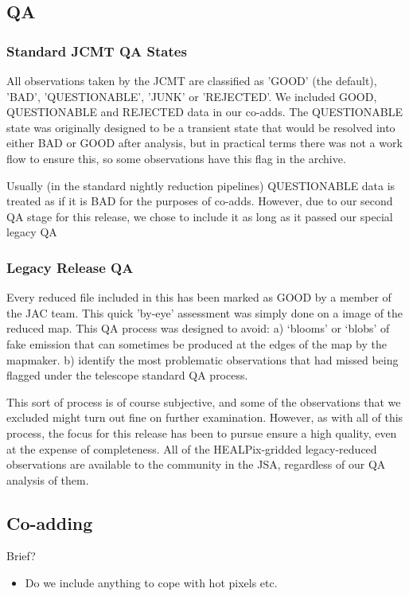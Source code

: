 \documentclass[usenatbib]{mn2e}
\begin{document}
\subsection{QA}

\subsubsection{Standard JCMT QA States}
All observations taken by the JCMT are classified as 'GOOD' (the
default), 'BAD', 'QUESTIONABLE', 'JUNK' or 'REJECTED'. We included
GOOD, QUESTIONABLE and REJECTED data in our co-adds. The QUESTIONABLE
state was originally designed to be a transient state that would be
resolved into either BAD or GOOD after analysis, but in practical
terms there was not a work flow to ensure this, so some observations
have this flag in the archive.

Usually (in the standard nightly reduction pipelines) QUESTIONABLE
data is treated as if it is BAD for the purposes of co-adds. However,
due to our second QA stage for this release, we chose to include it as
long as it passed our special legacy QA

\subsubsection{Legacy Release QA}

Every reduced file included in this has been marked as GOOD by a
member of the JAC team. This quick 'by-eye' assessment was simply done
on a image of the reduced map. This QA process was designed to avoid:
a) `blooms' or `blobs' of fake emission that can sometimes be produced
at the edges of the map by the mapmaker.  b) identify the most
problematic observations that had missed being flagged under the
telescope standard QA process.

This sort of process is of course subjective, and some of the
observations that we excluded might turn out fine on further
examination. However, as with all of this process, the focus for this
release has been to pursue ensure a high quality, even at the expense
of completeness. All of the HEALPix-gridded legacy-reduced
observations are available to the community in the JSA, regardless of
our QA analysis of them.





\subsection{Co-adding}
Brief?
\begin{itemize}
\item Do we include anything to cope with hot pixels etc.
\end{itemize}
\end{document}
